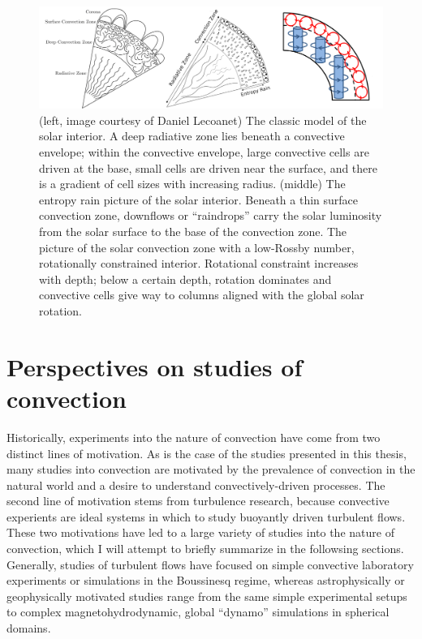\begin{figure}[ht!]
\includegraphics[width=\textwidth]{./figs/intro/conundrum_explanations.pdf}
\caption[Schematics of hypotheses that solve the convective conundrum.]
{
	(left, image courtesy of Daniel Lecoanet) The classic model of the solar interior.
	A deep radiative zone lies beneath a convective envelope; within the convective envelope, large convective cells are driven at the base, small cells are driven near the surface, and there is a gradient of cell sizes with increasing radius.
	(middle) The entropy rain picture of the solar interior.
	Beneath a thin surface convection zone, downflows or ``raindrops'' carry the solar luminosity from the solar surface to the base of the convection zone. 
	\citep[right, Fig.~3c of][]{featherstone&hindman2016b} The picture of the solar convection zone with a low-Rossby number, rotationally constrained interior.
	Rotational constraint increases with depth; below a certain depth, rotation dominates and convective cells give way to columns aligned with the global solar rotation.
	\label{fig:conundrum_solns} 
}
\end{figure}




\section{Perspectives on studies of convection}
Historically, experiments into the nature of convection have come from two distinct lines of motivation.
As is the case of the studies presented in this thesis, many studies into convection are motivated by the prevalence of convection in the natural world and a desire to understand convectively-driven processes.
The second line of motivation stems from turbulence research, because convective experients are ideal systems in which to study buoyantly driven turbulent flows.
These two motivations have led to a large variety of studies into the nature of convection, which I will attempt to briefly summarize in the followsing sections.
Generally, studies of turbulent flows have focused on simple convective laboratory experiments or simulations in the Boussinesq regime, whereas astrophysically or geophysically motivated studies range from the same simple experimental setups to complex magnetohydrodynamic, global ``dynamo'' simulations in spherical domains.

